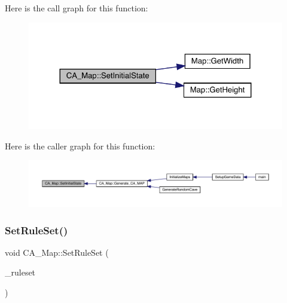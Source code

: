 Here is the call graph for this function\+:
\nopagebreak
\begin{figure}[H]
\begin{center}
\leavevmode
\includegraphics[width=324pt]{class_c_a___map_ad4c6a5b3ca7121d6c4593061d4bf3056_cgraph}
\end{center}
\end{figure}
Here is the caller graph for this function\+:
\nopagebreak
\begin{figure}[H]
\begin{center}
\leavevmode
\includegraphics[width=350pt]{class_c_a___map_ad4c6a5b3ca7121d6c4593061d4bf3056_icgraph}
\end{center}
\end{figure}
\mbox{\label{class_c_a___map_a5d22c84ef623d63d99300d1f83af143e}} 
\subsubsection{\texorpdfstring{Set\+Rule\+Set()}{SetRuleSet()}}
{\footnotesize\ttfamily void C\+A\+\_\+\+Map\+::\+Set\+Rule\+Set (\begin{DoxyParamCaption}\item[{\mbox{\hyperlink{_c_a_map_8hpp_a8502e9e74cc08ed2c245d58ff7cd4a88}{C\+A\+\_\+\+Rule\+Set}}}]{\+\_\+ruleset }\end{DoxyParamCaption})}

